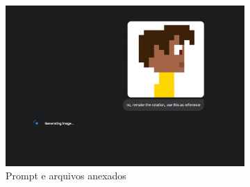 \begin{figure}[htbp]
    \centering
    \caption{\small Processo da geração 5 do sprite em side view no Gemini Pro em julho/2025}
    \label{fig:geminiPro5}

    \begin{subfigure}{0.8\linewidth}
        \includegraphics[width=1\linewidth]{figs/geminiPro/chat2/tela2.PNG}
        \caption{\small Prompt e arquivos anexados}
        \label{fig:geminiPro5Prompt}
    \end{subfigure}
    \begin{subfigure}{0.23\linewidth}

\end{subfigure}
\end{figure}
